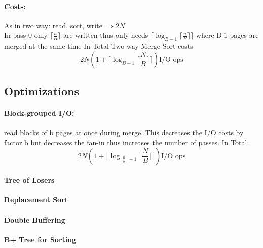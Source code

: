  \paragraph{Costs:} As in two way: read, sort, write $\Rightarrow 2N$ \\
 In pass 0 only $\lceil \frac{n}{B}\rceil$ are written thus only needs $\lceil \log_{B-1} \lceil \frac{n}{B}\rceil\rceil$ where B-1 pages are merged at the same time
 In Total Two-way Merge Sort costs \[ 2 N (1+ \lceil \log_{B-1} \lceil \frac{N}{B}\rceil\rceil) \text{I/O ops}\]
 
 \subsection{Optimizations}
 \paragraph{Block-grouped I/O:} read blocks of b pages at once during merge. This decreases the I/O costs by factor b but decreases the fan-in thus increases the number of passes. In Total:
 \[ 2 N (1+ \lceil \log_{\lfloor \frac{B}{b}\rfloor-1} \lceil \frac{N}{B}\rceil\rceil) \text{I/O ops}\]
 
 
 \paragraph{Tree of Losers}
 
 \paragraph{Replacement Sort}
 
 \paragraph{Double Buffering}
 
 \paragraph{B+ Tree for Sorting}
 
 